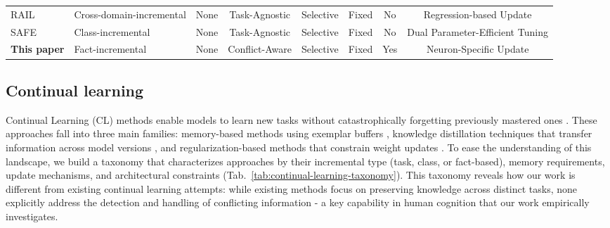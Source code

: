 \begin{table}[t]
{\begin{tabular}{@{}l p{3cm} c c c c c c@{}}
RAIL~\citep{xu2024advancing} & Cross-domain-incremental & None & Task-Agnostic & Selective & Fixed & No & Regression-based Update \\
SAFE~\citep{zhao2024safeslowfastparameterefficient} & Class-incremental & None & Task-Agnostic & Selective & Fixed & No & Dual Parameter-Efficient Tuning \\ \midrule
\textbf{This paper} & Fact-incremental & None & Conflict-Aware & Selective & Fixed & Yes & Neuron-Specific Update \\ \bottomrule
\end{tabular}%
}
\label{tab:continual-learning-taxonomy-extended}
\end{table}


\subsection{Continual learning}
Continual Learning (CL) methods enable models to learn new tasks without catastrophically forgetting previously mastered ones \citep{kirkpatrick2017overcoming}. These approaches fall into three main families: memory-based methods using exemplar buffers \citep{rebuffi2017icarl}, knowledge distillation techniques that transfer information across model versions \citep{lopez2017gradient}, and regularization-based methods that constrain weight updates \citep{kirkpatrick2017overcoming}. To ease the understanding of this landscape, we build a taxonomy that characterizes approaches by their incremental type (task, class, or fact-based), memory requirements, update mechanisms, and architectural constraints (Tab.~\ref{tab:continual-learning-taxonomy}). This taxonomy reveals how our work is different from existing continual learning attempts: while existing methods focus on preserving knowledge across distinct tasks, none explicitly address the detection and handling of conflicting information - a key capability in human cognition that our work empirically investigates.


